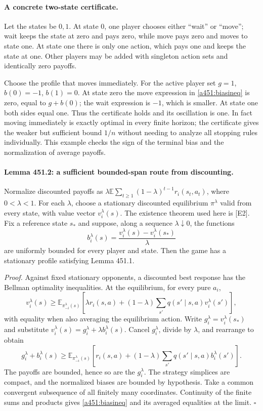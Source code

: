 \documentclass[11pt]{article}
\begin{document}
\paragraph{A concrete two-state certificate.}
Let the states be $0,1$. At state $0$, one player chooses either ``wait''
or ``move''; wait keeps the state at zero and pays zero, while move pays
zero and moves to state one. At state one there is only one action, which
pays one and keeps the state at one. Other players may be added with
singleton action sets and identically zero payoffs.

Choose the profile that moves immediately. For the active player set
$g=1$, $b(0)=-1$, $b(1)=0$. At state zero the move expression in
\eqref{a451:biasineq} is zero, equal to $g+b(0)$; the wait expression
is $-1$, which is smaller. At state one both sides equal one. Thus the
certificate holds and its oscillation is one. In fact moving immediately
is exactly optimal in every finite horizon; the certificate gives the
weaker but sufficient bound $1/n$ without needing to analyze all stopping
rules individually. This example checks the sign of the terminal bias
and the normalization of average payoffs.

\paragraph{Lemma 451.2: a sufficient bounded-span route from discounting.}
Normalize discounted payoffs as
$\lambda\mathbb E\sum_{t\ge1}(1-\lambda)^{t-1}r_i(s_t,a_t)$,
where $0<\lambda<1$. For each $\lambda$, choose a stationary discounted
equilibrium $\pi^\lambda$ valid from every state, with value vector
$v_i^\lambda(s)$. The existence theorem used here is [E2]. Fix a reference
state $s_*$ and suppose, along a sequence $\lambda\downarrow0$, the
functions
\begin{equation}\label{a451:normalizedbias}
 b_i^\lambda(s)=
 \frac{v_i^\lambda(s)-v_i^\lambda(s_*)}{\lambda}
\end{equation}
are uniformly bounded for every player and state. Then the game has a
stationary profile satisfying Lemma 451.1.

\emph{Proof.} Against fixed stationary opponents, a discounted best
response has the Bellman optimality inequalities. At the equilibrium,
for every pure $a_i$,
\[
 v_i^\lambda(s)\ge
 \mathbb E_{\pi_{-i}^\lambda(s)}
 \left[\lambda r_i(s,a)+(1-\lambda)
                    \sum_{s'}q(s'\mid s,a)v_i^\lambda(s')\right],
\]
with equality when also averaging the equilibrium action. Write
$g_i^\lambda=v_i^\lambda(s_*)$ and substitute
$v_i^\lambda(s)=g_i^\lambda+\lambda b_i^\lambda(s)$.
Cancel $g_i^\lambda$, divide by $\lambda$, and rearrange to obtain
\[
 g_i^\lambda+b_i^\lambda(s)\ge
 \mathbb E_{\pi_{-i}^\lambda(s)}
 \left[r_i(s,a)+(1-\lambda)\sum_{s'}q(s'\mid s,a)b_i^\lambda(s')\right].
\]
The payoffs are bounded, hence so are the $g_i^\lambda$. The strategy
simplices are compact, and the normalized biases are bounded by hypothesis.
Take a common convergent subsequence of all finitely many coordinates.
Continuity of the finite sums and products gives
\eqref{a451:biasineq} and its averaged equalities at the limit.
\hfill$\square$
\end{document}
